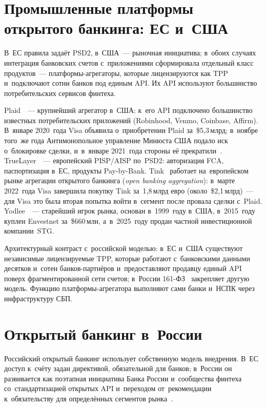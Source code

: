 \section{Промышленные платформы открытого банкинга: ЕС и~США}\label{sec:open-banking-platforms-eu-us}

В~ЕС правила задаёт PSD2, в~США~--- рыночная инициатива; в~обоих случаях
интеграция банковских счетов с~приложениями сформировала отдельный класс
продуктов~--- платформы-агрегаторы, которые лицензируются как TPP и~подключают
сотни банков под единым API. Их API используют большинство потребительских
сервисов финтеха.

Plaid~\cite{plaid-overview}~--- крупнейший агрегатор в~США: к~его API подключено
большинство известных потребительских приложений (Robinhood, Venmo, Coinbase,
Affirm). В~январе 2020~года Visa объявила о~приобретении Plaid за~\$5{,}3\,млрд;
в~ноябре того~же года Антимонопольное управление Минюста США подало иск
о~блокировке сделки, и~в~январе 2021~года стороны её
прекратили~\cite{plaid-visa-doj}. TrueLayer~\cite{truelayer-overview}~---
европейский PISP/AISP по~PSD2: авторизация FCA, паспортизация в~ЕС, продукты
Pay-by-Bank. Tink~\cite{tink-visa-acquisition} работает
на~европейском рынке агрегации открытого банкинга
(\textit{open banking aggregation}): в~марте 2022~года Visa завершила
покупку Tink за~1{,}8\,млрд евро (около~\$2{,}1\,млрд)~--- для Visa это была
вторая попытка войти в~сегмент после провала сделки с~Plaid.
Yodlee~\cite{yodlee-overview}~--- старейший игрок рынка, основан в~1999~году
в~США, в~2015~году куплен Envestnet за~\$660\,млн, а~в~2025~году продан частной
инвестиционной компании~STG.

Архитектурный контраст с~российской моделью: в~ЕС и~США существуют независимые
лицензируемые TPP, которые работают с~банковскими данными десятков и~сотен
банков-партнёров и~предоставляют продавцу единый API поверх фрагментированной сети
счетов; в~России 161-ФЗ~\cite{fz-161} закрепляет другую
модель. Функцию платформы-агрегатора выполняют сами банки и~НСПК через
инфраструктуру СБП.

\section{Открытый банкинг в~России}\label{sec:open-banking-russia}

Российский открытый банкинг использует собственную модель внедрения.
В~ЕС доступ к~счёту задан директивой, обязательной для банков; в~России он
развивается как поэтапная инициатива Банка России и~сообщества финтеха
со~стандартизацией открытых API и~переходом от~рекомендации к~обязательству
для определённых сегментов рынка~\cite{cbr-open-api,afe-open-api}.

